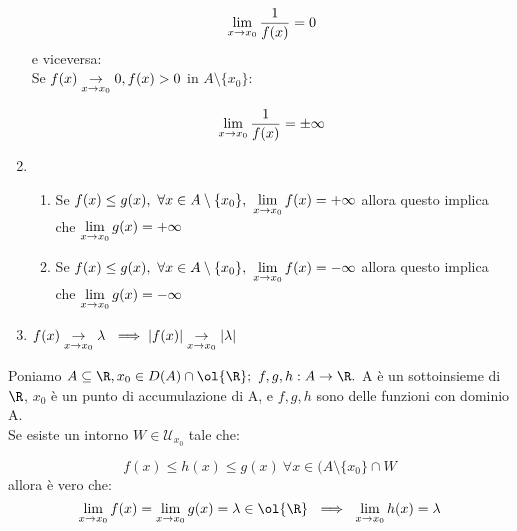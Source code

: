 \documentclass[../analisi.tex]{subfiles}
\begin{document}
\begin{defn}
\begin{enumerate}[label*=\arabic*.]
	\begin{equation}
		\lim \limits_{x \to x_0} \frac{1}{f(x)} = 0
	\end{equation}
	e viceversa:\\
	Se $f(x) \underset{x \to x_0}{\to} 0, f(x) > 0 $ in $A\setminus\{x_0\}$:

	\begin{equation}
		\lim \limits_{x \to x_0} \frac{1}{f(x)} = \pm\infty
	\end{equation}

\item 
	\begin{enumerate}[label=\Alph*.]
	\item
	Se $f(x) \leq g(x),\ \forall x \in A \setminus \{x_0\},\ 
	\limxo f(x) = +\infty
	$ allora questo implica che $\lim \limits_{x \to x_0} g(x) = +\infty$
	
	\item
	Se $f(x) \leq g(x),\ \forall x \in A \setminus \{x_0\},\ 
	\limxo f(x) = -\infty
	$ allora questo implica che $\lim \limits_{x \to x_0} g(x) = -\infty$
	\end{enumerate}

\item $f(x) \underset{x \to x_0}{\to} \lambda\ \implies |f(x)| \underset{x \to x_0}{\to} |\lambda|$

	\end{enumerate}


\end{defn}


\begin{defn}[2 carabinieri]
	Poniamo $\acr, x_0 \in D(A)\cap\ol{\R};\ f,g,h: A \to \R.$
	A è un sottoinsieme di $\R$, $x_0$ è un punto di accumulazione di A, e
	$f,g,h$ sono delle funzioni con dominio A.\\
	Se esiste un intorno $W \in \mathcal{U}_{x_0} $ tale che:

	\begin{equation}
		f(x) \leq h(x) \leq g(x)\ \forall x \in (A \setminus \{ x_0 \}\cap W
	\end{equation}
	allora è vero che:
	\begin{equation}
		\limxo f(x) = \limxo g(x) = \lambda \in \ol{\R} \ \implies
		\ \limxo h(x) = \lambda
	\end{equation}
\end{defn}
\end{document}
